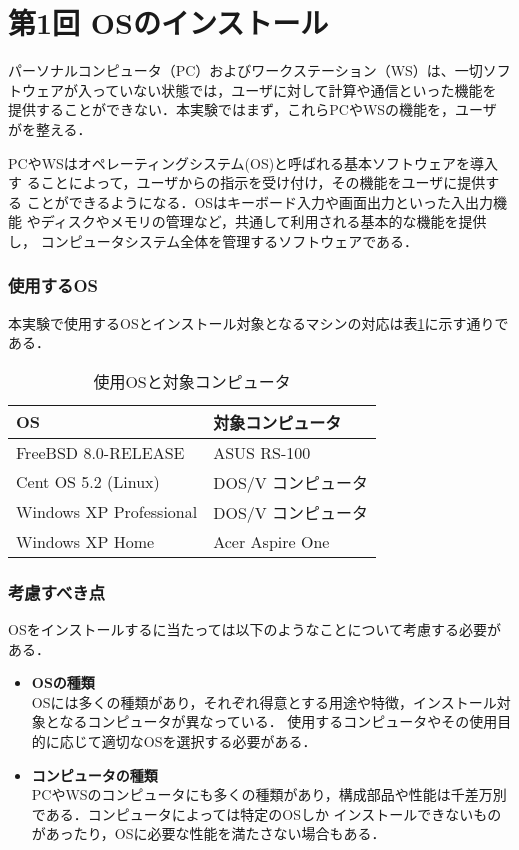 \section{第1回 OSのインストール}

パーソナルコンピュータ（PC）およびワークステーション（WS）は、一切ソフ
トウェアが入っていない状態では，ユーザに対して計算や通信といった機能を
提供することができない．本実験ではまず，これらPCやWSの機能を，ユーザ
が\textbf{}を整える．

PCやWSはオペレーティングシステム(OS)と呼ばれる基本ソフトウェアを導入す
ることによって，ユーザからの指示を受け付け，その機能をユーザに提供する
ことができるようになる．OSはキーボード入力や画面出力といった入出力機能
やディスクやメモリの管理など，共通して利用される基本的な機能を提供し，
コンピュータシステム全体を管理するソフトウェアである．

\vspace{-1zh}
\subsubsection*{使用するOS}
本実験で使用するOSとインストール対象となるマシンの対応は表\ref{sp1:tab:osandcomp}に示す通りである．
\begin{table}[h]
 \caption{使用OSと対象コンピュータ}%
 \label{sp1:tab:osandcomp}
 \begin{center}
  \begin{tabular}{|l|l|}
    \hline
     OS  &  対象コンピュータ  \\
    \hline
     FreeBSD 8.0-RELEASE  & ASUS RS-100   \\
    \hline
     Cent OS 5.2 (Linux)& DOS/V コンピュータ   \\
    \hline
     Windows XP Professional  & DOS/V コンピュータ   \\
    \hline
     Windows XP Home & Acer Aspire One   \\
    \hline
  \end{tabular}
 \end{center}
\end{table}

\vspace{-4zh}
\subsubsection*{考慮すべき点}
OSをインストールするに当たっては以下のようなことについて考慮する必要がある．
\begin{itemize}
  \item \textbf{OSの種類}\\
         OSには多くの種類があり，それぞれ得意とする用途や特徴，インストール対象となるコンピュータが異なっている．
         使用するコンピュータやその使用目的に応じて適切なOSを選択する必要がある．
  \item \textbf{コンピュータの種類}\\
         PCやWSのコンピュータにも多くの種類があり，構成部品や性能は千差万別である．コンピュータによっては特定のOSしか
         インストールできないものがあったり，OSに必要な性能を満たさない場合もある．
\end{itemize}
